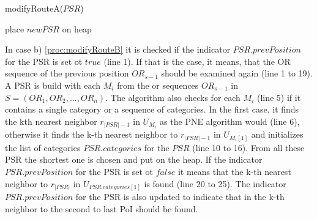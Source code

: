 \begin{procedure}[H]
	\label{proc:modifyRouteA}
	\caption{modifyRouteA($PSR$)}
		
	place $newPSR$ on heap\;
\end{procedure}

In case b) \ref{proc:modifyRouteB} it is checked if the indicator $PSR.prevPosition$ for the PSR is set ot $true$ (line 1). If that is the case, it means, that the OR sequence of the previous position $OR_{s-1}$ should be examined again (line 1 to 19). A PSR is build with each $M_i$ from the or sequences $OR_{s-1}$ in $S = (OR_1, OR_2, ..., OR_n)$. The algorithm also checks for each $M_i$ (line 5) if it contains a single category or a sequence of categories. In the first case, it finds the kth nearest neighbor $r_{|PSR|-1}$ in $U_{M_{i}}$ as the PNE algorithm would (line 6), otherwise it finds the k-th nearest neighbor to $r_{|PSR|-1}$ in $U_{M_i[1]}$ and initializes the list of categories $PSR.categories$ for the $PSR$ (line 10 to 16). From all these PSR the shortest one is chosen and put on the heap. 
If the indicator $PSR.prevPosition$ for the PSR is set ot $false$  it means that the k-th nearest neighbor to $r_{|PSR|}$ in $U_{PSR.categories[1]}$ is found (line 20 to 25). The indicator $PSR.prevPosition$ for the PSR is also updated to indicate that in  the k-th neighbor to the second to last PoI should be found. \newline

